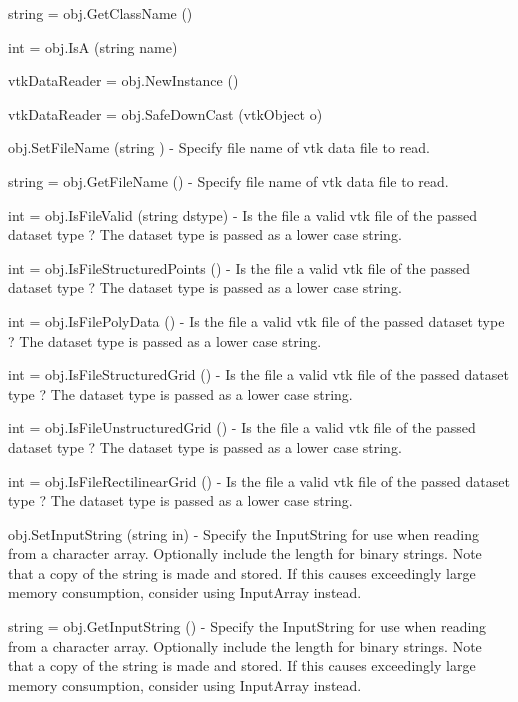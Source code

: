 \begin{DoxyItemize}
\item {\ttfamily string = obj.\-Get\-Class\-Name ()}  
\item {\ttfamily int = obj.\-Is\-A (string name)}  
\item {\ttfamily vtk\-Data\-Reader = obj.\-New\-Instance ()}  
\item {\ttfamily vtk\-Data\-Reader = obj.\-Safe\-Down\-Cast (vtk\-Object o)}  
\item {\ttfamily obj.\-Set\-File\-Name (string )} -\/ Specify file name of vtk data file to read.  
\item {\ttfamily string = obj.\-Get\-File\-Name ()} -\/ Specify file name of vtk data file to read.  
\item {\ttfamily int = obj.\-Is\-File\-Valid (string dstype)} -\/ Is the file a valid vtk file of the passed dataset type ? The dataset type is passed as a lower case string.  
\item {\ttfamily int = obj.\-Is\-File\-Structured\-Points ()} -\/ Is the file a valid vtk file of the passed dataset type ? The dataset type is passed as a lower case string.  
\item {\ttfamily int = obj.\-Is\-File\-Poly\-Data ()} -\/ Is the file a valid vtk file of the passed dataset type ? The dataset type is passed as a lower case string.  
\item {\ttfamily int = obj.\-Is\-File\-Structured\-Grid ()} -\/ Is the file a valid vtk file of the passed dataset type ? The dataset type is passed as a lower case string.  
\item {\ttfamily int = obj.\-Is\-File\-Unstructured\-Grid ()} -\/ Is the file a valid vtk file of the passed dataset type ? The dataset type is passed as a lower case string.  
\item {\ttfamily int = obj.\-Is\-File\-Rectilinear\-Grid ()} -\/ Is the file a valid vtk file of the passed dataset type ? The dataset type is passed as a lower case string.  
\item {\ttfamily obj.\-Set\-Input\-String (string in)} -\/ Specify the Input\-String for use when reading from a character array. Optionally include the length for binary strings. Note that a copy of the string is made and stored. If this causes exceedingly large memory consumption, consider using Input\-Array instead.  
\item {\ttfamily string = obj.\-Get\-Input\-String ()} -\/ Specify the Input\-String for use when reading from a character array. Optionally include the length for binary strings. Note that a copy of the string is made and stored. If this causes exceedingly large memory consumption, consider using Input\-Array instead.  

\end{DoxyItemize}
